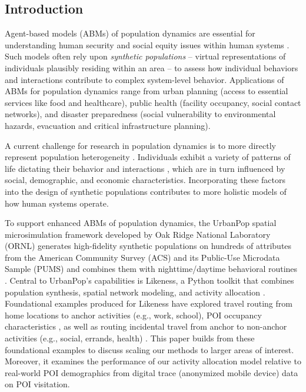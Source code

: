 \subsection{Introduction}\label{introduction}

Agent-based models (ABMs) of population dynamics are essential for understanding human security and social equity issues within human systems \cite{germann2022assessing, ozik2021population, urbanpop-AG-2023}. Such models often rely upon \emph{synthetic populations} -- virtual representations of individuals plausibly residing within an area -- to assess how individual behaviors and interactions contribute to complex system-level behavior. Applications of ABMs for population dynamics range from urban planning (access to essential services like food and healthcare), public health (facility occupancy, social contact networks), and disaster preparedness (social vulnerability to environmental hazards, evacuation and critical infrastructure planning). 

A current challenge for research in population dynamics is to more directly represent population heterogeneity \cite{BRaVE_DOE_2022}. Individuals exhibit a variety of patterns of life dictating their behavior and interactions \cite{pappalardo2015returners}, which are in turn influenced by social, demographic, and economic characteristics. Incorporating these factors into the design of synthetic populations contributes to more holistic models of how human systems operate.

To support enhanced ABMs of population dynamics, the UrbanPop spatial microsimulation framework developed by Oak Ridge National Laboratory (ORNL) generates high-fidelity synthetic populations on hundreds of attributes from the American Community Survey (ACS) and its Public-Use Microdata Sample (PUMS) and combines them with nighttime/daytime behavioral routines \cite{urbanpop-AG-2023}. Central to UrbanPop's capabilities is Likeness, a Python toolkit that combines population synthesis, spatial network modeling, and activity allocation \cite{likeness-scipy-paper-2022, likeness-scipy-poster-2022}. Foundational examples produced for Likeness have explored travel routing from home locations to anchor activities (e.g., work, school), POI occupancy characteristics \cite{likeness-scipy-paper-2022, likeness-scipy-poster-2022}, as well as routing incidental travel from anchor to non-anchor activities (e.g., social, errands, health) \cite{likeness_aag_2023}. This paper builds from these foundational examples to
discuss scaling our methods to larger areas of interest. Moreover, it examines the performance of our activity allocation model relative to real-world POI demographics from digital trace (anonymized mobile device) data on POI visitation.

